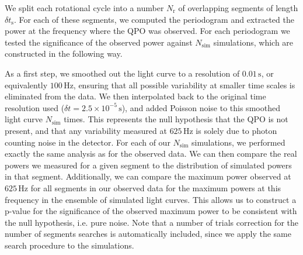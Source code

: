 \documentclass{emulateapj}
\begin{document}
We split each rotational cycle into a number $N_\mathrm{r}$ of overlapping segments of length $\delta t_{\mathrm{s}}$. For each of these segments, we computed the periodogram and extracted the power at the frequency where the QPO was observed. For each periodogram we tested the significance of the observed power against $N_{\mathrm{sim}}$ simulations, which are constructed in the following way.

As a first step, we smoothed out the light curve to a resolution of $0.01 \, \mathrm{s}$, or equivalently $100 \, \mathrm{Hz}$, ensuring that all possible variability at smaller time scales is eliminated from the data. We then interpolated back to the original time resolution used ($\delta t = 2.5 \times 10^{-5} \, \mathrm{s}$), and added Poisson noise to this smoothed light curve $N_{\mathrm{sim}}$ times. This represents the null hypothesis that the QPO is not present, and that any variability measured at $625 \, \mathrm{Hz}$ is solely due to photon counting noise in the detector. For each of our $N_{\mathrm{sim}}$ simulations, we performed exactly the same analysis as for the observed data. We can then compare the real powers we measured for a given segment to the distribution of simulated powers in that segment. Additionally, we can compare the maximum power observed at $625 \, \mathrm{Hz}$ for all segments in our observed data for the maximum powers at this frequency in the ensemble of simulated light curves. This allows us to construct a p-value for the significance of the observed maximum power to be consistent with the null hypothesis, i.e. pure noise. Note that a number of trials correction for the number of segments searches is automatically included, since we apply the same search procedure to the simulations.
\end{document}
